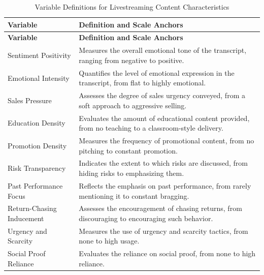 \begin{longtable}{lp{}}

\caption{Variable Definitions for Livestreaming Content Characteristics}\label{tab:content_characteristics_definitions} \\

  \toprule
  \textbf{Variable}          & \textbf{Definition and Scale Anchors}                                                                 \\
  \midrule
  \endfirsthead%
  \midrule
  \textbf{Variable}          & \textbf{Definition and Scale Anchors}                                                                 \\
  \midrule
  \endhead%
  \endfoot%
  \endlastfoot%

  Sentiment Positivity       & Measures the overall emotional tone of the transcript, ranging from negative to positive.             \\
  \midrule
  Emotional Intensity        & Quantifies the level of emotional expression in the transcript, from flat to highly emotional.        \\
  \midrule
  Sales Pressure             & Assesses the degree of sales urgency conveyed, from a soft approach to aggressive selling.            \\
  \midrule
  Education Density          & Evaluates the amount of educational content provided, from no teaching to a classroom-style delivery. \\
  \midrule
  Promotion Density          & Measures the frequency of promotional content, from no pitching to constant promotion.                \\
  \midrule
  Risk Transparency          & Indicates the extent to which risks are discussed, from hiding risks to emphasizing them.             \\
  \midrule
  Past Performance Focus     & Reflects the emphasis on past performance, from rarely mentioning it to constant bragging.            \\
  \midrule
  Return-Chasing Inducement  & Assesses the encouragement of chasing returns, from discouraging to encouraging such behavior.        \\
  \midrule
  Urgency and Scarcity       & Measures the use of urgency and scarcity tactics, from none to high usage.                            \\
  \midrule
  Social Proof Reliance      & Evaluates the reliance on social proof, from none to high reliance.                                   \\

\end{longtable}
